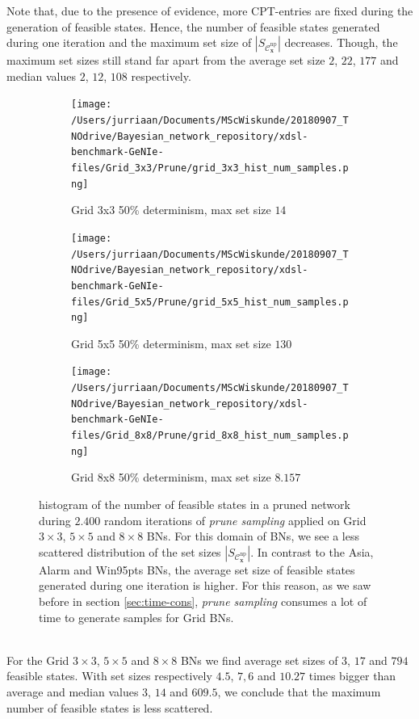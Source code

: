 \documentclass[a4paper, twoside, 11pt]{report}
\newcommand{\bfx}{{\mathbf{x}}}
\newcommand{\C}{{\mathcal C}}
\theoremstyle{plain}
\theoremstyle{definition}
\theoremstyle{remark}
\newcommand{\ps}{\textit{prune sampling }}
\begin{document}
Note that, due to the presence of evidence, more CPT-entries are fixed during the generation of feasible states. Hence, the number of feasible states generated during one iteration and the maximum set size of $|S_{\C_\bfx^{\text{np}}}|$ decreases. Though, the maximum set sizes still stand far apart from the average set size $2$, $22$, $177$ and median values $2$, $12$, $108$ respectively.
\begin{figure}[b!]
\centering
\captionsetup[subfigure]{justification=centering}

\begin{subfigure}{.3\linewidth}
\texttt{[image: /Users/jurriaan/Documents/MScWiskunde/20180907\_TNOdrive/Bayesian\_network\_repository/xdsl-benchmark-GeNIe-files/Grid\_3x3/Prune/grid\_3x3\_hist\_num\_samples.png]}
\caption{Grid 3x3 50\% determinism, max set size $14$}%
\label{grid_3x3}%
\end{subfigure}\hfill%
\begin{subfigure}{.3\linewidth}
\texttt{[image: /Users/jurriaan/Documents/MScWiskunde/20180907\_TNOdrive/Bayesian\_network\_repository/xdsl-benchmark-GeNIe-files/Grid\_5x5/Prune/grid\_5x5\_hist\_num\_samples.png]}
\caption{Grid 5x5 50\% determinism, max set size $130$}%
\label{grid_5x5}%
\end{subfigure}\hfill%
\begin{subfigure}{.3\linewidth}
\texttt{[image: /Users/jurriaan/Documents/MScWiskunde/20180907\_TNOdrive/Bayesian\_network\_repository/xdsl-benchmark-GeNIe-files/Grid\_8x8/Prune/grid\_8x8\_hist\_num\_samples.png]}
\caption{Grid 8x8 50\% determinism, max set size $8.157$}%
\label{grid_8x8}%
\end{subfigure}\hfill%

\vspace{0.75pc}
\caption{histogram of the number of feasible states in a pruned network during $2.400$ random iterations of \ps applied on Grid $3 \times 3$, $5 \times 5$ and $8 \times 8$ BNs. For this domain of BNs, we see a less scattered distribution of the set sizes $|S_{\C_\bfx^{\text{np}}}|$. In contrast to the Asia, Alarm and Win95pts BNs, the average set size of feasible states generated during one iteration is higher. For this reason, as we saw before in section \ref{sec:time-cons}, \ps consumes a lot of time to generate samples for Grid BNs. }
\label{results6}
\end{figure}\\ 

For the Grid $3 \times 3$, $5 \times 5$ and $8 \times 8$ BNs we find average set sizes of $3$, $17$ and $794$ feasible states. With set sizes respectively $4.5$, $7,6$ and $10.27$ times bigger than average and median values $3$, $14$ and $609.5$, we conclude that the maximum number of feasible states is less scattered.\\
\end{document}
